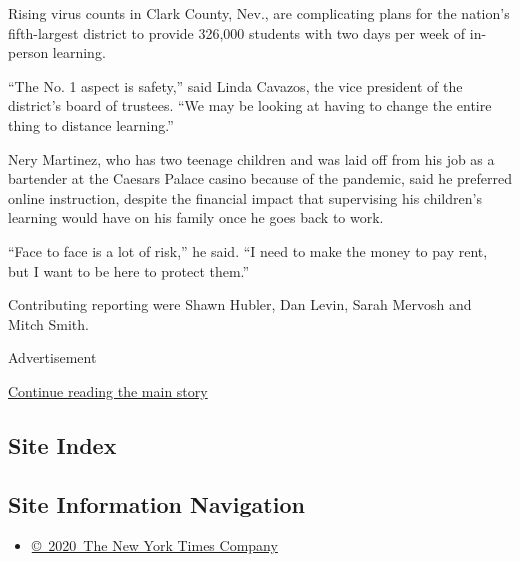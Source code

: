 Rising virus counts in Clark County, Nev., are complicating plans for
the nation's fifth-largest district to provide 326,000 students with two
days per week of in-person learning.

``The No. 1 aspect is safety,'' said Linda Cavazos, the vice president
of the district's board of trustees. ``We may be looking at having to
change the entire thing to distance learning.''

Nery Martinez, who has two teenage children and was laid off from his
job as a bartender at the Caesars Palace casino because of the pandemic,
said he preferred online instruction, despite the financial impact that
supervising his children's learning would have on his family once he
goes back to work.

``Face to face is a lot of risk,'' he said. ``I need to make the money
to pay rent, but I want to be here to protect them.''

Contributing reporting were Shawn Hubler, Dan Levin, Sarah Mervosh and
Mitch Smith.

Advertisement

\protect\hyperlink{after-bottom}{Continue reading the main story}

\hypertarget{site-index}{%
\subsection{Site Index}\label{site-index}}

\hypertarget{site-information-navigation}{%
\subsection{Site Information
Navigation}\label{site-information-navigation}}

\begin{itemize}
\tightlist
\item
  \href{https://help.nytimes.com/hc/en-us/articles/115014792127-Copyright-notice}{©~2020~The
  New York Times Company}
\end{itemize}

